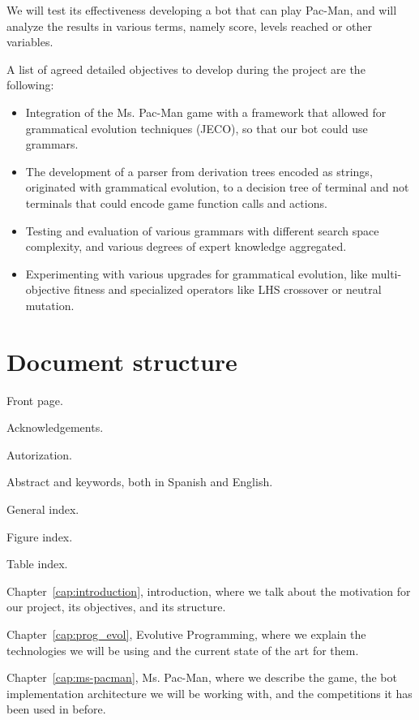 We will test its effectiveness developing a bot that can play Pac-Man, and will analyze the results in various terms, namely score, levels reached or other variables.
 
A list of agreed detailed objectives to develop during the project are the following:
\begin{itemize}
\item Integration of the Ms. Pac-Man game with a framework that allowed for grammatical evolution techniques (JECO), so that our bot could use grammars.

\item The development of a parser from derivation trees encoded as strings, originated with grammatical evolution, to a decision tree of terminal and not terminals that could encode game function calls and actions.

\item Testing and evaluation of various grammars with different search space complexity, and various degrees of expert knowledge aggregated.

\item Experimenting with various upgrades for grammatical evolution, like multi-objective fitness and specialized operators like LHS crossover or neutral mutation. 
\end{itemize}

\section{Document structure}

Front page.

Acknowledgements.

Autorization.

Abstract and keywords, both in Spanish and English.

General index.

Figure index.

Table index.

Chapter~\ref{cap:introduction}, introduction, where we talk about the motivation for our project, its objectives, and its structure.

Chapter~\ref{cap:prog_evol}, Evolutive Programming, where we explain the technologies we will be using and the current state of the art for them.

Chapter~\ref{cap:ms-pacman}, Ms. Pac-Man, where we describe the game, the bot implementation architecture we will be working with, and the competitions it has been used in before.

